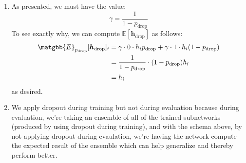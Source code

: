 \documentclass[12pt]{article}
\begin{document}
\begin{enumerate}[label=(\alph*)]
      \begin{enumerate}[label=\roman*]
        \item As presented, we must have the value:
          $$
            \gamma = \frac{1}{1 - p_{\text{drop}}}
          $$
          To see exactly why, we can compute $\mathbb{E}[\bm{h}_{\text{drop}}]$ as follows:
          \begin{align*}
            \matgbb{E}_{p_{\text{drop}}}[\bm{h}_{\text{drop}}]_i &= \gamma\cdot 0 \cdot h_i p_{\text{drop}} + \gamma \cdot 1 \cdot h_i (1 - p_{\text{drop}}) \\
            &= \frac{1}{1 - p_{\text{drop}}} \cdot (1 - p_{\text{drop}}) h_i \\
            &= h_i
          \end{align*}
          as desired.
        \item We apply dropout during training but not during evaluation because during evaluation, we're taking an ensemble of all of the trained subnetworks (produced by using dropout during training), and with the schema above, by not applying dropout during evaulation, we're having the network compute the expected result of the ensemble which can help generalize and thereby perform better.
      \end{enumerate}
\end{enumerate}
\end{document}
